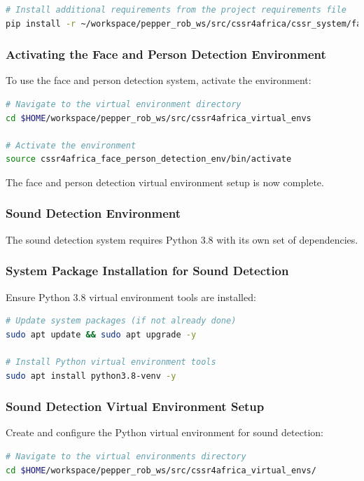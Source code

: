 \documentclass{CSSRforAfrica}
\begin{document}
{\begin{lstlisting}[style=withoutNumbering, language=bash]
# Install additional requirements from the project requirements file
pip install -r ~/workspace/pepper_rob_ws/src/cssr4africa/cssr_system/face_detection/face_detection_requirements_x86.txt
\end{lstlisting}

\subsubsection*{Activating the Face and Person Detection Environment}
To use the face and person detection system, activate the environment:
\begin{lstlisting}[style=withoutNumbering, language=bash]
# Navigate to the virtual environment directory
cd $HOME/workspace/pepper_rob_ws/src/cssr4africa_virtual_envs

# Activate the environment
source cssr4africa_face_person_detection_env/bin/activate
\end{lstlisting}

The face and person detection virtual environment setup is now complete.

\subsubsection*{Sound Detection Environment}
The sound detection system requires Python 3.8 with its own set of dependencies.

\subsubsection*{System Package Installation for Sound Detection}
Ensure Python 3.8 virtual environment tools are installed:
\begin{lstlisting}[style=withoutNumbering, language=bash]
# Update system packages (if not already done)
sudo apt update && sudo apt upgrade -y

# Install Python virtual environment tools
sudo apt install python3.8-venv -y
\end{lstlisting}

\subsubsection*{Sound Detection Virtual Environment Setup}
Create and configure the Python virtual environment for sound detection:
\begin{lstlisting}[style=withoutNumbering, language=bash]
# Navigate to the virtual environments directory
cd $HOME/workspace/pepper_rob_ws/src/cssr4africa_virtual_envs/


\end{lstlisting}}
\end{document}
